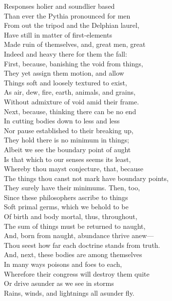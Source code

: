 Responses holier and soundlier based\\
Than ever the Pythia pronounced for men\\
From out the tripod and the Delphian laurel,\\
Have still in matter of first-elements\\
Made ruin of themselves, and, great men, great\\
Indeed and heavy there for them the fall:\\
First, because, banishing the void from things,\\
They yet assign them motion, and allow\\
Things soft and loosely textured to exist,\\
As air, dew, fire, earth, animals, and grains,\\
Without admixture of void amid their frame.\\
Next, because, thinking there can be no end\\
In cutting bodies down to less and less\\
Nor pause established to their breaking up,\\
They hold there is no minimum in things;\\
Albeit we see the boundary point of aught\\
Is that which to our senses seems its least,\\
Whereby thou mayst conjecture, that, because\\
The things thou canst not mark have boundary points,\\
They surely have their minimums. Then, too,\\
Since these philosophers ascribe to things\\
Soft primal germs, which we behold to be\\
Of birth and body mortal, thus, throughout,\\
The sum of things must be returned to naught,\\
And, born from naught, abundance thrive anew—\\
Thou seest how far each doctrine stands from truth.\\
And, next, these bodies are among themselves\\
In many ways poisons and foes to each,\\
Wherefore their congress will destroy them quite\\
Or drive asunder as we see in storms\\
Rains, winds, and lightnings all asunder fly.\\
